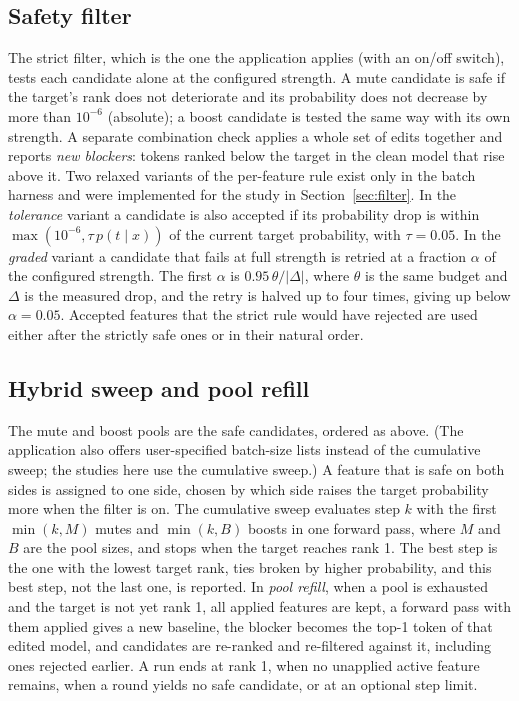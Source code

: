 \documentclass[conference]{IEEEtran}
\begin{document}
\subsection{Safety filter}
\label{sec:safety}
The strict filter, which is the one the application applies (with an on/off switch), tests each candidate alone at the configured strength. A mute candidate is safe if the target's rank does not deteriorate and its probability does not decrease by more than $10^{-6}$ (absolute); a boost candidate is tested the same way with its own strength. A separate combination check applies a whole set of edits together and reports \emph{new blockers}: tokens ranked below the target in the clean model that rise above it. Two relaxed variants of the per-feature rule exist only in the batch harness and were implemented for the study in Section~\ref{sec:filter}. In the \emph{tolerance} variant a candidate is also accepted if its probability drop is within $\max(10^{-6},\tau\,p(t\mid x))$ of the current target probability, with $\tau=0.05$. In the \emph{graded} variant a candidate that fails at full strength is retried at a fraction $\alpha$ of the configured strength. The first $\alpha$ is $0.95\,\theta/\lvert\Delta\rvert$, where $\theta$ is the same budget and $\Delta$ is the measured drop, and the retry is halved up to four times, giving up below $\alpha=0.05$. Accepted features that the strict rule would have rejected are used either after the strictly safe ones or in their natural order.

\subsection{Hybrid sweep and pool refill}
\label{sec:sweep}
The mute and boost pools are the safe candidates, ordered as above. (The application also offers user-specified batch-size lists instead of the cumulative sweep; the studies here use the cumulative sweep.) A feature that is safe on both sides is assigned to one side, chosen by which side raises the target probability more when the filter is on. The cumulative sweep evaluates step $k$ with the first $\min(k,M)$ mutes and $\min(k,B)$ boosts in one forward pass, where $M$ and $B$ are the pool sizes, and stops when the target reaches rank 1. The best step is the one with the lowest target rank, ties broken by higher probability, and this best step, not the last one, is reported. In \emph{pool refill}, when a pool is exhausted and the target is not yet rank 1, all applied features are kept, a forward pass with them applied gives a new baseline, the blocker becomes the top-1 token of that edited model, and candidates are re-ranked and re-filtered against it, including ones rejected earlier. A run ends at rank 1, when no unapplied active feature remains, when a round yields no safe candidate, or at an optional step limit.
\end{document}
